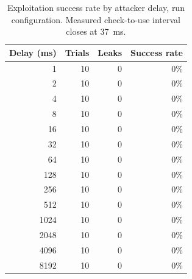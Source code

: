 \begin{table}[ht]
\centering
\begin{tabular}{rrrr}
\hline
Delay (ms) & Trials & Leaks & Success rate \\
\hline
1 & 10 & 0 & 0\% \\
2 & 10 & 0 & 0\% \\
4 & 10 & 0 & 0\% \\
8 & 10 & 0 & 0\% \\
16 & 10 & 0 & 0\% \\
32 & 10 & 0 & 0\% \\
64 & 10 & 0 & 0\% \\
128 & 10 & 0 & 0\% \\
256 & 10 & 0 & 0\% \\
512 & 10 & 0 & 0\% \\
1024 & 10 & 0 & 0\% \\
2048 & 10 & 0 & 0\% \\
4096 & 10 & 0 & 0\% \\
8192 & 10 & 0 & 0\% \\
\hline
\end{tabular}
\caption{Exploitation success rate by attacker delay, run configuration. Measured check-to-use interval closes at 37~ms.}
\label{tab:success-run}
\end{table}
